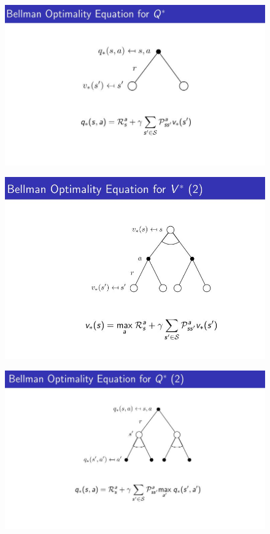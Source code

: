\documentclass[10pt, a4paper, twocolumn]{article} %
\begin{document}
\begin{figure}[H]
	\begin{centering}
		\includegraphics[width = \linewidth]{bellmanOptQ.jpg}
	\end{centering}
\end{figure}

\begin{figure}[H]
	\begin{centering}
		\includegraphics[width = \linewidth]{bellmanOptV2.jpg}
	\end{centering}
\end{figure}

\begin{figure}[H]
	\begin{centering}
		\includegraphics[width = \linewidth]{bellmanOptQ2.jpg}
	\end{centering}
\end{figure}
\end{document}
